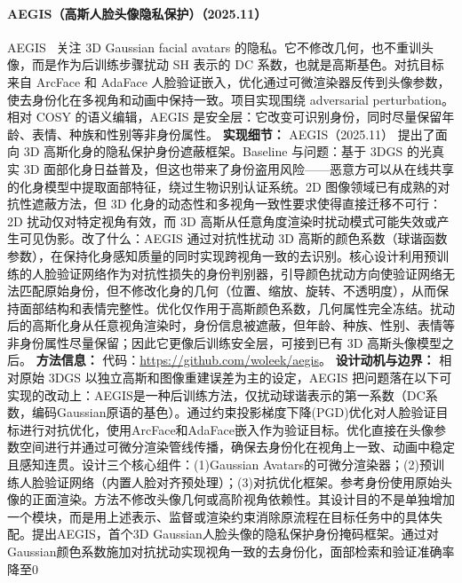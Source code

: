 \paragraph{AEGIS（高斯人脸头像隐私保护）（2025.11）}
AEGIS~\cite{2511_17747} 关注 3D Gaussian facial avatars 的隐私。它不修改几何，也不重训头像，而是作为后训练步骤扰动 SH 表示的 DC 系数，也就是高斯基色。对抗目标来自 ArcFace 和 AdaFace 人脸验证嵌入，优化通过可微渲染器反传到头像参数，使去身份化在多视角和动画中保持一致。项目实现围绕 adversarial perturbation。相对 COSY 的语义编辑，AEGIS 是安全层：它改变可识别身份，同时尽量保留年龄、表情、种族和性别等非身份属性。
\textbf{实现细节：} AEGIS（2025.11） 提出了面向 3D 高斯化身的隐私保护身份遮蔽框架。Baseline 与问题：基于 3DGS 的光真实 3D 面部化身日益普及，但这也带来了身份盗用风险——恶意方可以从在线共享的化身模型中提取面部特征，绕过生物识别认证系统。2D 图像领域已有成熟的对抗性遮蔽方法，但 3D 化身的动态性和多视角一致性要求使得直接迁移不可行：2D 扰动仅对特定视角有效，而 3D 高斯从任意角度渲染时扰动模式可能失效或产生可见伪影。改了什么：AEGIS 通过对抗性扰动 3D 高斯的颜色系数（球谐函数参数），在保持化身感知质量的同时实现跨视角一致的去识别。核心设计利用预训练的人脸验证网络作为对抗性损失的身份判别器，引导颜色扰动方向使验证网络无法匹配原始身份，但不修改化身的几何（位置、缩放、旋转、不透明度），从而保持面部结构和表情完整性。优化仅作用于高斯颜色系数，几何属性完全冻结。扰动后的高斯化身从任意视角渲染时，身份信息被遮蔽，但年龄、种族、性别、表情等非身份属性尽量保留；因此它更像后训练安全层，可接到已有 3D 高斯头像模型之后。
\textbf{方法信息：} 代码：\url{https://github.com/woleek/aegis}。
\textbf{设计动机与边界：} 相对原始 3DGS 以独立高斯和图像重建误差为主的设定，AEGIS 把问题落在以下可实现的改动上：AEGIS是一种后训练方法，仅扰动球谐表示的第一系数（DC系数，编码Gaussian原语的基色）。通过约束投影梯度下降(PGD)优化对人脸验证目标进行对抗优化，使用ArcFace和AdaFace嵌入作为验证目标。优化直接在头像参数空间进行并通过可微分渲染管线传播，确保去身份化在视角上一致、动画中稳定且感知连贯。设计三个核心组件：(1)Gaussian Avatars的可微分渲染器；(2)预训练人脸验证网络（内置人脸对齐预处理）；(3)对抗优化框架。参考身份使用原始头像的正面渲染。方法不修改头像几何或高阶视角依赖性。其设计目的不是单独增加一个模块，而是用上述表示、监督或渲染约束消除原流程在目标任务中的具体失配。提出AEGIS，首个3D Gaussian人脸头像的隐私保护身份掩码框架。通过对Gaussian颜色系数施加对抗扰动实现视角一致的去身份化，面部检索和验证准确率降至0%
